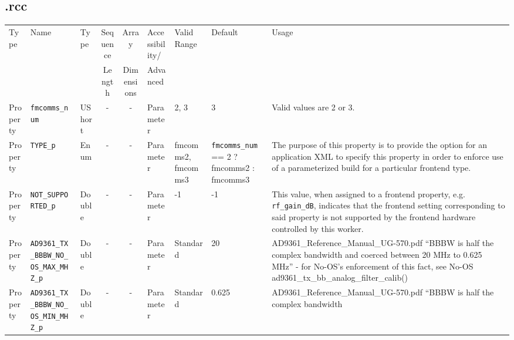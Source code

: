\begin{landscape}
	\subsection*{\comp.rcc}
	\begin{scriptsize}
		\begin{longtable}{|p{1.8cm}|p{4.1cm}|p{1cm}|c|c|p{1.6cm}|p{3.7cm}|p{3.7cm}|p{2.5cm}|}
			\hline
			\rowcolor{blue}
			Type         & Name                                & Type & Sequence & Array      & Accessibility/ & Valid Range  & Default & Usage                                                                                                                                                                                                                       \\
			\rowcolor{blue}
			             &                                     &      & Length   & Dimensions & Advanced       &              &         &                                                                                                                                                                                                                             \\
			\hline
			Property     & \verb+fmcomms_num+                   & UShort &-        & -          & Parameter & 2, 3 & 3 & Valid values are 2 or 3.\\
			\hline
			Property     & \verb+TYPE_p+                   & Enum &-        & -          & Parameter & fmcomms2, fmcomms3 & \verb+fmcomms_num+ == 2 ? fmcomms2 : fmcomms3 & The purpose of this property is to provide the option for     an application XML to specify this property in order to enforce use of a parameterized build for a     particular frontend type.\\
			\hline
			Property     & \verb+NOT_SUPPORTED_p+                   & Double&-        & -          & Parameter & -1 & -1 & This value, when assigned to a frontend property, e.g. \verb+rf_gain_dB+, indicates that the frontend setting corresponding to said property is not supported by the frontend hardware controlled by this worker.
			 \\
			\hline
			Property     & \verb+AD9361_TX_BBBW_NO_OS_MAX_MHZ_p+ & Double & -       & -          & Parameter & Standard & 20 & AD9361\_Reference\_Manual\_UG-570.pdf ``BBBW is half the complex bandwidth
        and coerced between 20 MHz to 0.625 MHz'' - for No-OS's enforcement of
        this fact, see No-OS ad9361\_tx\_bb\_analog\_filter\_calib()  \\
			\hline
			Property     & \verb+AD9361_TX_BBBW_NO_OS_MIN_MHZ_p+ & Double & -       & -          & Parameter & Standard & 0.625 & AD9361\_Reference\_Manual\_UG-570.pdf ``BBBW is half the complex bandwidth

\end{longtable}
\end{scriptsize}
\end{landscape}
